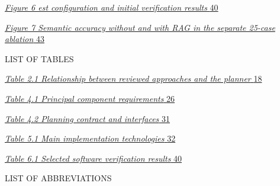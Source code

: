 \documentclass[
]{article}
\begin{document}
\protect\hyperlink{_Toc242369084}{\emph{Figure 6 est configuration and
initial verification results} \protect\hyperlink{_Toc242369084}{40}}

\protect\hyperlink{_Toc242369085}{\emph{Figure 7 Semantic accuracy
without and with RAG in the separate 25-case ablation}
\protect\hyperlink{_Toc242369085}{43}}

LIST OF TABLES

\protect\hyperlink{_Toc242369086}{\emph{Table 2.1 Relationship between
reviewed approaches and the planner}
\protect\hyperlink{_Toc242369086}{18}}

\protect\hyperlink{_Toc242369087}{\emph{Table 4.1 Principal component
requirements} \protect\hyperlink{_Toc242369087}{26}}

\protect\hyperlink{_Toc242369088}{\emph{Table 4.2 Planning contract and
interfaces} \protect\hyperlink{_Toc242369088}{31}}

\protect\hyperlink{_Toc242369089}{\emph{Table 5.1 Main implementation
technologies} \protect\hyperlink{_Toc242369089}{32}}

\protect\hyperlink{_Toc242369090}{\emph{Table 6.1 Selected software
verification results} \protect\hyperlink{_Toc242369090}{40}}

LIST OF ABBREVIATIONS
\end{document}
